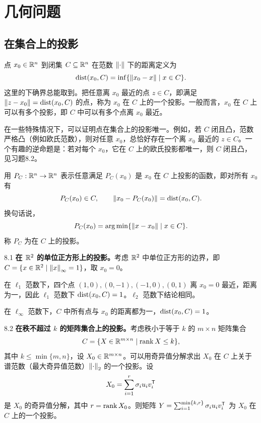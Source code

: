 \chapter{几何问题}
\section{在集合上的投影}
点 $x_0\in\mathbb R^n$ 到闭集 $C\subseteq\mathbb R^n$ 在范数 $\left\lVert \cdot\right\rVert$ 下的距离定义为
\[\operatorname{dist}(x_0,C)=\inf\{\left\lVert x_0-x\right\rVert\mid x\in C\}.\]
这里的下确界总能取到。把任意离 $x_0$ 最近的点 $z\in C$，即满足 $\left\lVert z-x_0\right\rVert=\operatorname{dist}(x_0,C)$ 的点，称为 $x_0$ 在 $C$ 上的一个投影。一般而言，$x_0$ 在 $C$ 上可以有多个投影，即 $C$ 中可以有多个点离 $x_0$ 最近。

在一些特殊情况下，可以证明点在集合上的投影唯一。例如，若 $C$ 闭且凸，范数严格凸（例如欧氏范数），则对任意 $x_0$，总恰好存在一个离 $x_0$ 最近的 $z\in C$。一个有趣的逆命题是：若对每个 $x_0$，它在 $C$ 上的欧氏投影都唯一，则 $C$ 闭且凸，见习题8.2。

用 $P_C:\mathbb R^n\to\mathbb R^n$ 表示任意满足 $P_C(x_0)$ 是 $x_0$ 在 $C$ 上投影的函数，即对所有 $x_0$ 有
\[P_C(x_0)\in C,\qquad\left\lVert x_0-P_C(x_0)\right\rVert=\operatorname{dist}(x_0,C).\]
换句话说，
\[P_C(x_0)=\operatorname*{arg\,min}\{\left\lVert x-x_0\right\rVert\mid x\in C\}.\]
称 $P_C$ 为在 $C$ 上的投影。
\begin{origexample}{8.1}
\textbf{在 $\mathbb R^2$ 的单位正方形上的投影。}考虑 $\mathbb R^2$ 中单位正方形的边界，即 $C=\{x\in\mathbb R^2\mid\left\lVert x\right\rVert_\infty=1\}$，取 $x_0=0$。

在 $\ell_1$ 范数下，四个点 $(1,0),(0,-1),(-1,0),(0,1)$ 离 $x_0=0$ 最近，距离为一，因此 $\ell_1$ 范数下 $\operatorname{dist}(x_0,C)=1$。$\ell_2$ 范数下结论相同。

在 $\ell_\infty$ 范数下，$C$ 中所有点与 $x_0$ 的距离都为一，$\operatorname{dist}(x_0,C)=1$。
\end{origexample}
\begin{origexample}{8.2}
\textbf{在秩不超过 $k$ 的矩阵集合上的投影。}考虑秩小于等于 $k$ 的 $m\times n$ 矩阵集合
\[C=\{X\in\mathbb R^{m\times n}\mid\operatorname{rank} X\leq k\},\]
其中 $k\leq\min\{m,n\}$，设 $X_0\in\mathbb R^{m\times n}$。可以用奇异值分解求出 $X_0$ 在 $C$ 上关于谱范数（最大奇异值范数）$\left\lVert \cdot\right\rVert_2$ 的一个投影。设
\[X_0=\sum_{i=1}^r\sigma_i u_iv_i^\mathsf T\]
是 $X_0$ 的奇异值分解，其中 $r=\operatorname{rank} X_0$。则矩阵 $Y=\sum_{i=1}^{\min\{k,r\}}\sigma_i u_iv_i^\mathsf T$ 为 $X_0$ 在 $C$ 上的一个投影。
\end{origexample}
